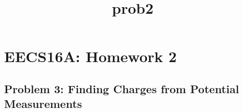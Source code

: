 \documentclass[11pt]{article}
\title{prob2}
\begin{document}
    
    
    \maketitle
    
    

    
    \hypertarget{eecs16a-homework-2}{%
\section{EECS16A: Homework 2}\label{eecs16a-homework-2}}

    \hypertarget{problem-3-finding-charges-from-potential-measurements}{%
\subsection{Problem 3: Finding Charges from Potential
Measurements}\label{problem-3-finding-charges-from-potential-measurements}}
\end{document}
